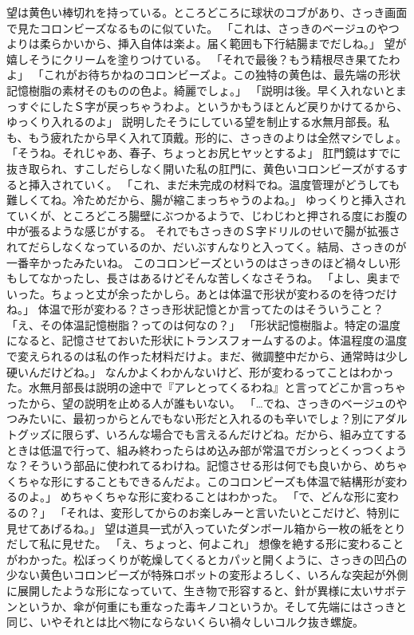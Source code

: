 望は黄色い棒切れを持っている。ところどころに球状のコブがあり、さっき画面で見たコロンビーズなるものに似ていた。
「これは、さっきのベージュのやつよりは柔らかいから、挿入自体は楽よ。届く範囲も下行結腸までだしね。」
望が嬉しそうにクリームを塗りつけている。
「それで最後？もう精根尽き果てたわよ」
「これがお待ちかねのコロンビーズよ。この独特の黄色は、最先端の形状記憶樹脂の素材そのものの色よ。綺麗でしょ。」
「説明は後。早く入れないとまっすぐにしたＳ字が戻っちゃうわよ。というかもうほとんど戻りかけてるから、ゆっくり入れるのよ」
説明したそうにしている望を制止する水無月部長。私も、もう疲れたから早く入れて頂戴。形的に、さっきのよりは全然マシでしょ。
「そうね。それじゃあ、春子、ちょっとお尻ヒヤッとするよ」
肛門鏡はすでに抜き取られ、すこしだらしなく開いた私の肛門に、黄色いコロンビーズがするすると挿入されていく。
「これ、まだ未完成の材料でね。温度管理がどうしても難しくてね。冷ためだから、腸が縮こまっちゃうのよね。」
ゆっくりと挿入されていくが、ところどころ腸壁にぶつかるようで、じわじわと押される度にお腹の中が張るような感じがする。
それでもさっきのＳ字ドリルのせいで腸が拡張されてだらしなくなっているのか、だいぶすんなりと入ってく。結局、さっきのが一番辛かったみたいね。
このコロンビーズというのはさっきのほど禍々しい形もしてなかったし、長さはあるけどそんな苦しくなさそうね。
「よし、奥までいった。ちょっと丈が余ったかしら。あとは体温で形状が変わるのを待つだけね。」
体温で形が変わる？さっき形状記憶とか言ってたのはそういうこと？
「え、その体温記憶樹脂？ってのは何なの？」
「形状記憶樹脂よ。特定の温度になると、記憶させておいた形状にトランスフォームするのよ。体温程度の温度で変えられるのは私の作った材料だけよ。まだ、微調整中だから、通常時は少し硬いんだけどね。」
なんかよくわかんないけど、形が変わるってことはわかった。水無月部長は説明の途中で『アレとってくるわね』と言ってどこか言っちゃったから、望の説明を止める人が誰もいない。
「…でね、さっきのベージュのやつみたいに、最初っからとんでもない形だと入れるのも辛いでしょ？別にアダルトグッズに限らず、いろんな場合でも言えるんだけどね。だから、組み立てするときは低温で行って、組み終わったらはめ込み部が常温でガシっとくっつくような？そういう部品に使われてるわけね。記憶させる形は何でも良いから、めちゃくちゃな形にすることもできるんだよ。このコロンビーズも体温で結構形が変わるのよ。」
めちゃくちゃな形に変わることはわかった。
「で、どんな形に変わるの？」
「それは、変形してからのお楽しみーと言いたいとこだけど、特別に見せてあげるね。」
望は道具一式が入っていたダンボール箱から一枚の紙をとりだして私に見せた。
「え、ちょっと、何よこれ」
想像を絶する形に変わることがわかった。松ぼっくりが乾燥してくるとカパッと開くように、さっきの凹凸の少ない黄色いコロンビーズが特殊ロボットの変形よろしく、いろんな突起が外側に展開したような形になっていて、生き物で形容すると、針が異様に太いサボテンというか、傘が何重にも重なった毒キノコというか。そして先端にはさっきと同じ、いやそれとは比べ物にならないくらい禍々しいコルク抜き螺旋。
